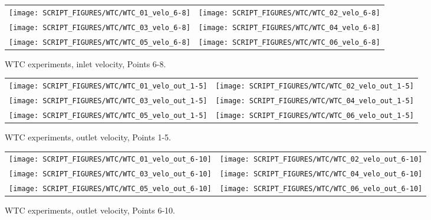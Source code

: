 \begin{figure}[p]
\begin{tabular*}{\textwidth}{l@{\extracolsep{\fill}}r}
\texttt{[image: SCRIPT\_FIGURES/WTC/WTC\_01\_velo\_6-8]} &
\texttt{[image: SCRIPT\_FIGURES/WTC/WTC\_02\_velo\_6-8]} \\
\texttt{[image: SCRIPT\_FIGURES/WTC/WTC\_03\_velo\_6-8]} &
\texttt{[image: SCRIPT\_FIGURES/WTC/WTC\_04\_velo\_6-8]} \\
\texttt{[image: SCRIPT\_FIGURES/WTC/WTC\_05\_velo\_6-8]} &
\texttt{[image: SCRIPT\_FIGURES/WTC/WTC\_06\_velo\_6-8]}
\end{tabular*}
\caption{WTC experiments, inlet velocity, Points 6-8.}
\label{WTC_velo_6-8}
\end{figure}

\begin{figure}[p]
\begin{tabular*}{\textwidth}{l@{\extracolsep{\fill}}r}
\texttt{[image: SCRIPT\_FIGURES/WTC/WTC\_01\_velo\_out\_1-5]} &
\texttt{[image: SCRIPT\_FIGURES/WTC/WTC\_02\_velo\_out\_1-5]} \\
\texttt{[image: SCRIPT\_FIGURES/WTC/WTC\_03\_velo\_out\_1-5]} &
\texttt{[image: SCRIPT\_FIGURES/WTC/WTC\_04\_velo\_out\_1-5]} \\
\texttt{[image: SCRIPT\_FIGURES/WTC/WTC\_05\_velo\_out\_1-5]} &
\texttt{[image: SCRIPT\_FIGURES/WTC/WTC\_06\_velo\_out\_1-5]}
\end{tabular*}
\caption{WTC experiments, outlet velocity, Points 1-5.}
\label{WTC_velo_out_1-5}
\end{figure}

\begin{figure}[p]
\begin{tabular*}{\textwidth}{l@{\extracolsep{\fill}}r}
\texttt{[image: SCRIPT\_FIGURES/WTC/WTC\_01\_velo\_out\_6-10]} &
\texttt{[image: SCRIPT\_FIGURES/WTC/WTC\_02\_velo\_out\_6-10]} \\
\texttt{[image: SCRIPT\_FIGURES/WTC/WTC\_03\_velo\_out\_6-10]} &
\texttt{[image: SCRIPT\_FIGURES/WTC/WTC\_04\_velo\_out\_6-10]} \\
\texttt{[image: SCRIPT\_FIGURES/WTC/WTC\_05\_velo\_out\_6-10]} &
\texttt{[image: SCRIPT\_FIGURES/WTC/WTC\_06\_velo\_out\_6-10]}
\end{tabular*}
\caption{WTC experiments, outlet velocity, Points 6-10.}
\label{WTC_velo_out_6-10}
\end{figure}



\clearpage


